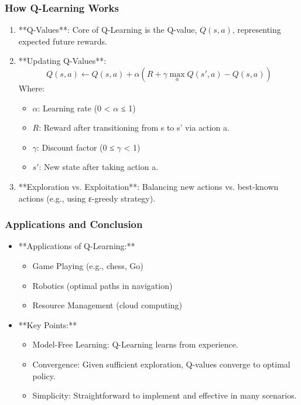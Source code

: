 \documentclass[aspectratio=169]{beamer}
\begin{document}
\begin{frame}[fragile]
  \frametitle{How Q-Learning Works}
  \begin{enumerate}
    \item **Q-Values**: Core of Q-Learning is the Q-value, \( Q(s, a) \), representing expected future rewards.
    \item **Updating Q-Values**: 
      \[
      Q(s, a) \leftarrow Q(s, a) + \alpha \left(R + \gamma \max_a Q(s', a) - Q(s, a)\right)
      \]
      Where:
      \begin{itemize}
        \item \( \alpha \): Learning rate (0 < \( \alpha \) ≤ 1)
        \item \( R \): Reward after transitioning from s to s' via action a.
        \item \( \gamma \): Discount factor (0 ≤ \( \gamma \) < 1)
        \item \( s' \): New state after taking action a.
      \end{itemize}
    \item **Exploration vs. Exploitation**: Balancing new actions vs. best-known actions (e.g., using ε-greedy strategy).
  \end{enumerate}
\end{frame}

\begin{frame}[fragile]
  \frametitle{Applications and Conclusion}
  \begin{itemize}
    \item **Applications of Q-Learning:**
    \begin{itemize}
      \item Game Playing (e.g., chess, Go)
      \item Robotics (optimal paths in navigation)
      \item Resource Management (cloud computing)
    \end{itemize}
    \item **Key Points:**
    \begin{itemize}
      \item Model-Free Learning: Q-Learning learns from experience.
      \item Convergence: Given sufficient exploration, Q-values converge to optimal policy.
      \item Simplicity: Straightforward to implement and effective in many scenarios.
    \end{itemize}
  \end{itemize}
\end{frame}
\end{document}
